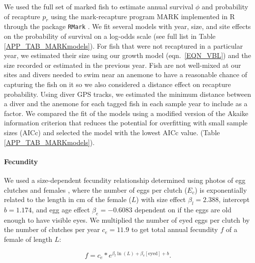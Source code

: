 \documentclass[12pt, oneside]{article}   	%
\begin{document}
We used the full set of marked fish to estimate annual survival $\phi$ and probability of recapture $p_r$ using the mark-recapture program MARK implemented in R through the package \texttt{RMark} \citep{RMark_Laake2013}. We fit several models with year, size, and site effects on the probability of survival on a log-odds scale (see full list in Table \ref{APP_TAB_MARKmodels}). For fish that were not recaptured in a particular year, we estimated their size using our growth model (eqn.\ \ref{EQN_VBL}) and the size recorded or estimated in the previous year. Fish are not well-mixed at our sites and divers needed to swim near an anemone to have a reasonable chance of capturing the fish on it so we also considered a distance effect on recapture probability. Using diver GPS tracks, we estimated the minimum distance between a diver and the anemone for each tagged fish in each sample year to include as a factor. We compared the fit of the models using a modified version of the Akaike information criterion that reduces the potential for overfitting with small sample sizes (AICc) and selected the model with the lowest AICc value. (Table \ref{APP_TAB_MARKmodels}).

\paragraph*{Fecundity}

We used a size-dependent fecundity relationship determined using photos of egg clutches and females \citep{yawdoszynInPrepfecundity}, where the number of eggs per clutch ($E_c$) is exponentially related to the length in cm of the female ($L$) with size effect $\beta_l = 2.388$, intercept $b = 1.174$, and egg age effect $\beta_e = -0.6083$ dependent on if the eggs are old enough to have visible eyes. We multiplied the number of eyed eggs per clutch by the number of clutches per year $c_e = 11.9$ \citep[estimate from][]{holtswarth2017fecundity} to get total annual fecundity $f$ of a female of length $L$:

\begin{equation}
f = c_e * e^{\beta_l\ln(L) + \beta_e[\text{eyed}] + b}. \label{EQN_Fec}
\end{equation}

\end{document}
